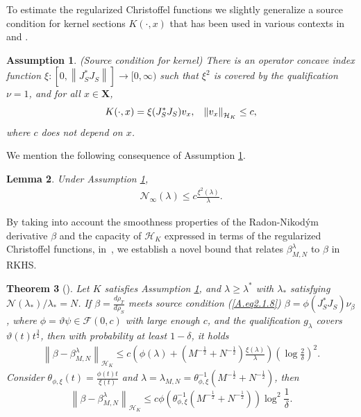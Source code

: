 \documentclass[USenglish]{article}
\newcommand{\norm}[1]{\left\lVert#1\right\rVert}
\newcommand{\bX}{\mathbf{X}}
\newcommand{\lam}{\lambda}
\newcommand{\hk}{{\mathcal{H}_K}}
\newtheorem{theorem}{Theorem}[section]
\newtheorem{lemma}[theorem]{Lemma}
\newtheorem{assumption}[theorem]{Assumption}
\begin{document}
To estimate the regularized Christoffel functions we slightly generalize a source condition for kernel sections $K(\cdot,x)$ that has been used in various contexts in \cite{shuai2019Analysis} and \cite{devito2014}.
\begin{assumption} \label{assum:source_cond_kernel}
	(Source condition for kernel) There is an operator concave index function $\xi : [0, \norm{J^*_S J_S}] \to [0,\infty)$ such that  $\xi^2$ is covered by the qualification $\nu=1$, and for all $x \in \bX $,
	\begin{align*}
	    K(\cdot, x) = \xi (J^*_S J_S) v_x, \hspace*{0.3cm} \norm{v_x}_\hk \leq c, 
	\end{align*}
	where $c$ does not depend on $x$.	
\end{assumption}
We mention the following consequence of Assumption \ref{assum:source_cond_kernel}.
\begin{lemma}
\label{lem:N_infty_bound}
	Under Assumption \ref{assum:source_cond_kernel},
	\begin{align*}
	    \mathcal{N}_\infty (\lambda) \leq c \frac{\xi^2(\lambda)}{\lambda}. 
	\end{align*}
\end{lemma}
By taking into account the smoothness properties of the Radon-Nikod\'ym derivative $\beta$ and the capacity of $\hk$ expressed in terms of the regularized Christoffel functions, in~\cite{nguyen2023regularized}, we establish a novel bound that relates $\beta_{M, N}^\lambda$ to $\beta$ in RKHS.

\begin{theorem}[\cite{nguyen2023regularized}]
\label{thm4.5}
	Let $K$ satisfies Assumption \ref{assum:source_cond_kernel}, and $\lam \geq \lam^*$ with $\lam_*$ satisfying $\mathcal{N}(\lam_*)/\lam_* = N$. If $\beta = \frac{d\rho_T}{d\rho_S}$ meets source condition (\ref{A.eq2.1.8}) $\beta = \phi (J_S^* J_S) \nu_\beta$, where $\phi = \vartheta \psi \in \mathcal{F} (0,c)$ with large enough $c$, and the qualification $g_\lam$ covers $\vartheta (t) t^\frac32$, then with probability at least $1 - \delta$, it holds
	\begin{align*}
		\norm{\beta - \beta^\lam_{M,N}}_\hk \leq c \left( \phi(\lam) +  (M^{-\frac12} + N^{-\frac12}) \frac{\xi (\lam)}{\lam} \right) \left( \log \frac{2}{\delta}\right)^2.
	\end{align*}
	Consider $\theta_{\phi,\xi} (t) = \frac{\phi(t) t}{\xi(t)}$ and $\lam = \lambda_{M,N} = \theta_{\phi,\xi}^{-1} (M^{-\frac12} + N^{-\frac12})$, then
	$$\norm{\beta - \beta^\lam_{M,N}}_\hk \leq c \phi\left(\theta_{\phi,\xi}^{-1} (M^{-\frac12} + N^{-\frac12})\right) \log^2 \frac1\delta.$$
\end{theorem}
\end{document}
